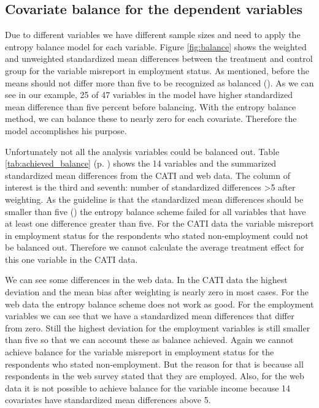 \subsection{Covariate balance for the dependent variables}

Due to different variables we have different sample sizes and need to apply the entropy balance model for each variable. Figure \ref{fig:balance} shows the weighted and unweighted standardized mean differences between the treatment and control group for the variable misreport in employment status. As mentioned, before the means should not differ more than five to be recognized as balanced (\cite{Caliendoetal08}). As we can see in our example, 25 of 47 variables in the model have higher standardized mean difference than five percent before balancing. With the entropy balance method, we can balance these to nearly zero for each covariate. Therefore the model accomplishes his purpose.

Unfortunately not all the analysis variables could be balanced out. Table \ref{tab:achieved_balance} (p. \pageref{tab:achieved_balance}) shows the 14 variables and the summarized standardized mean differences from the CATI and web data. The column of interest is the third and seventh: number of standardized differences \textgreater5 after weighting. As the guideline is that the standardized mean differences should be smaller than five (\cite{Caliendoetal05}) the entropy balance scheme failed for all variables that have at least one difference greater than five. For the CATI data the variable misreport in employment status for the respondents who stated non-employment could not be balanced out. Therefore we cannot calculate the average treatment effect for this one variable in the CATI data.

We can see some differences in the web data. In the CATI data the highest deviation and the mean bias after weighting is nearly zero in most cases. For the web data the entropy balance scheme does not work as good. For the employment variables we can see that we have a standardized mean differences that differ from zero. Still the highest deviation for the employment variables is still smaller than five so that we can account these as balance achieved. Again we cannot achieve balance for the variable misreport in employment status for the respondents who stated non-employment. But the reason for that is because all respondents in the web survey stated that they are employed. Also, for the web data it is not possible to achieve balance for the variable income because 14 covariates have standardized mean differences above 5.

